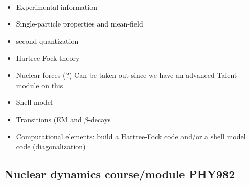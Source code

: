 \documentclass[%
twoside,                 %
final,                   %
10pt]{article}
\begin{document}
\paragraph{}
\begin{itemize}
\item Experimental information

\item Single-particle properties and mean-field

\item second quantization

\item Hartree-Fock theory

\item Nuclear forces (?) Can be taken out since we have an advanced Talent module on this

\item Shell model

\item Transitions (EM and $\beta$-decays

\item Computational elements: build a Hartree-Fock code and/or a shell model code (diagonalization)
\end{itemize}

\noindent



\subsection*{Nuclear dynamics course/module  PHY982}

\paragraph{}
\end{document}
